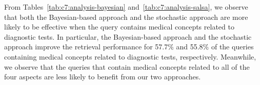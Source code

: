 \documentclass[1p]{elsarticle}
\begin{document}
From Tables~\ref{tab:c7:analysis-bayesian} and~\ref{tab:c7:analysis-salsa}, we observe that both the Bayesian-based approach and the stochastic approach are more likely to be effective when the query contains medical concepts related to diagnostic tests. In particular, the Bayesian-based approach and the stochastic approach improve the retrieval performance for 57.7\% and 55.8\% of the queries containing medical concepts related to diagnostic tests, respectively. 
% 
Meanwhile, we observe that the queries that contain medical concepts related to all of the four aspects are less likely to benefit from our two approaches.  


\end{document}
